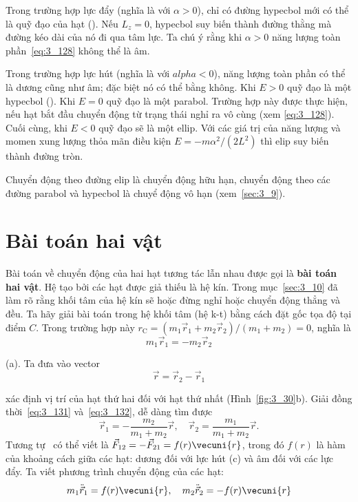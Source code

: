 Trong trường hợp lực đẩy (nghĩa là với $\alpha>0$), chỉ có đường hypecbol mới có thể là quỹ đạo của hạt (). Nếu $L_z=0$, hypecbol suy biến thành đường thằng mà đường kéo dài của nó đi qua tâm lực. Ta chú ý rằng khi $\alpha>0$ năng lượng toàn phần~\eqref{eq:3_128} không thể là âm.

Trong trường hợp lực hút (nghĩa là với $alpha<0$), năng lượng toàn phần có thể là dương cũng như âm; đặc biệt nó có thể bằng không. Khi $E>0$ quỹ đạo là một hypecbol (). Khi $E=0$ quỹ đạo là một parabol. Trường hợp này được thực hiện, nếu hạt bắt đầu chuyển động từ trạng thái nghỉ ra vô cùng (xem \eqref{eq:3_128}). Cuối cùng, khi $E<0$ quỹ đạo sẽ là một ellip. Với các giá trị của năng lượng và momen xung lượng thỏa mãn điều kiện $E=- m\alpha^2/(2L^2)$ thì elip suy biến thành đường tròn.

Chuyển động theo đường elip là chuyển động hữu hạn, chuyển động theo các đường parabol và hypecbol là chuyể động vô hạn (xem~\ref{sec:3_9}).

\section{Bài toán hai vật}\label{sec:3_19}

Bài toán về chuyển động của hai hạt tương tác lẫn nhau được gọi là \textbf{bài toán hai vật}. Hệ tạo bởi các hạt được giả thiếu là hệ kín. Trong mục~\ref{sec:3_10} đã làm rõ rằng khối tâm của hệ kín sẽ hoặc đừng nghỉ hoặc chuyển động thẳng và đều. Ta hãy giải bài toán trong hệ khối tâm (hệ k-t) bằng cách đặt gốc tọa độ tại điểm $C$. Trong trường hợp này $r_{\text{C}}=(m_1\vec{r}_1+m_2\vec{r}_2)/(m_1+m_2)=0$, nghĩa là 
\begin{equation}\label{eq:3_131}
m_1\vec{r}_1 = -m_2\vec{r}_2
\end{equation}

\noindent
(a). Ta đưa vào vector
\begin{equation}\label{eq:3_132}
\vec{r} = \vec{r}_2 - \vec{r}_1
\end{equation}

\noindent
xác định vị trí của hạt thứ hai đối với hạt thứ nhất (Hình~\ref{fig:3_30}b). Giải đồng thời~\eqref{eq:3_131} và~\eqref{eq:3_132}, dễ dàng tìm được 
\begin{equation}\label{eq:3_133}
\vec{r}_1 = -\frac{m_2}{m_1+m_2}\vec{r},\quad \vec{r}_2 = \frac{m_1}{m_1+m_2}\vec{r}.
\end{equation}
Tương tự~ có thể viết là $\vec{F}_{12}=-\vec{F}_{21}=f(r)\vecuni{r}$, trong đó $f(r)$ là hàm của khoảng cách giữa các hạt: dương đối với lực hút (c) và âm đối với các lực đẩy. Ta viết phương trình chuyển động của các hạt: 
\begin{equation*}
m_1\ddot{\vec{r}}_1 = f(r)\vecuni{r},\quad m_2\ddot{\vec{r}}_2 = -f(r)\vecuni{r}
\end{equation*}


